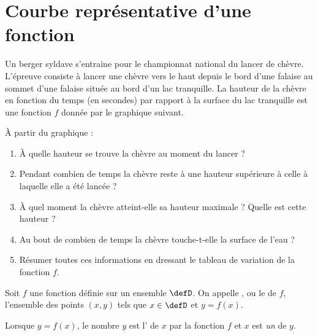 
\section{Courbe représentative d'une fonction}

\begin{Aprojeter}
    
    Un berger syldave s'entraine pour le championnat national du lancer de chèvre. L'épreuve consiste à lancer une chèvre vers le haut depuis le bord d'une falaise au sommet d'une falaise située au bord d'un lac tranquille. La hauteur de la chèvre en fonction du temps (en secondes) par rapport à la surface du lac tranquille est une fonction \( f\) donnée par le graphique suivant.

    \begin{center}
        
    \end{center}
    À partir du graphique :
    \begin{enumerate}
        \item
            À quelle hauteur se trouve la chèvre au moment du lancer ?
        \item
            Pendant combien de temps la chèvre reste à une hauteur supérieure à celle à laquelle elle a été lancée ?
        \item
            À quel moment la chèvre atteint-elle sa hauteur maximale ? Quelle est cette hauteur ?
        \item
            Au bout de combien de temps la chèvre touche-t-elle la surface de l'eau ?
        \item
            Résumer toutes ces informations en dressant le tableau de variation de la fonction \( f\).
    \end{enumerate}
\end{Aprojeter}


\begin{definition}
Soit $f$ une fonction définie sur un ensemble $\defD$.
    On appelle , ou le  de $f$, l'ensemble des points $(x,y)$ tels que $x\in\defD$ et $y=f(x)$.

    Lorsque \( y=f(x)\), le nombre \( y\) est l' de \( x\) par la fonction \( f\) et \( x\) est \emph{un}  de \( y\).
\end{definition}

